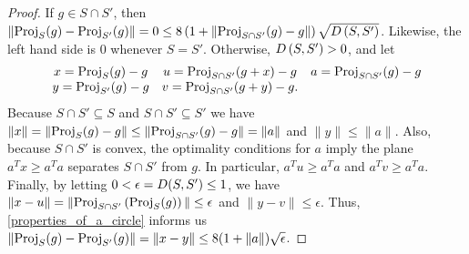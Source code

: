 
\begin{proof}



If $g \in S \cap S'$, then $\left\|{\textrm{Proj}}_S(g) - {\textrm{Proj}}_{S'}(g)\right\| = 0 \le 8\left(1 + \|{\textrm{Proj}}_{S \cap S'}(g) - g\|\right) \sqrt{{D}\left(S, S'\right)}$.
Likewise, the left hand side is $0$ whenever $S = S'$.
Otherwise, ${D}\left(S, S'\right) > 0$, and let 
\begin{align*}
\begin{array}{ccc}
x = {\textrm{Proj}}_S(g) - g      & u = {\textrm{Proj}}_{S \cap S'}(g + x) - g & a = {\textrm{Proj}}_{S \cap S'}(g) - g \\
y = {\textrm{Proj}}_{S'}(g) - g   & v = {\textrm{Proj}}_{S \cap S'}(g + y) - g. &  \\
\end{array}
\end{align*}
Because $S \cap S' \subseteq S$ and $S \cap S' \subseteq S'$ we have
$\|x\| = \|{\textrm{Proj}}_S(g) - g\| \le \|{\textrm{Proj}}_{S \cap S'} (g) - g\| = \|a\|$ and $\|y\| \le \|a\|$.
Also, because $S \cap S'$ is convex, the optimality conditions for $a$ imply the plane $a^Tx \ge a^Ta$ separates $S \cap S'$ from $g$.
In particular, $a^Tu \ge a^Ta$ and $a^Tv \ge a^Ta$.
Finally, by letting $0 < \epsilon = {D}(S, S') \le 1$, we have $\|x - u\| = \|{\textrm{Proj}}_{S \cap S'}\left({\textrm{Proj}}_S(g)\right)\| \le \epsilon$ and $\|y - v\| \le \epsilon$.
Thus, \cref{properties_of_a_circle} informs us
$\|{\textrm{Proj}}_S(g) - {\textrm{Proj}}_{S'}(g)\| = \|x - y\| \le 8(1 + \|a\|) \sqrt{\epsilon}$.
\end{proof}


